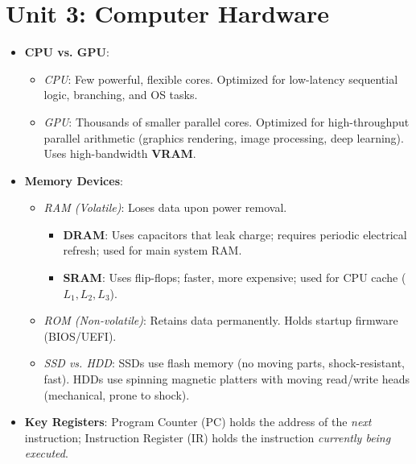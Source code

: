 \section*{Unit 3: Computer Hardware}
\begin{itemize}[leftmargin=6mm]
    \item \textbf{CPU vs. GPU}:
    \begin{itemize}
        \item \textit{CPU}: Few powerful, flexible cores. Optimized for low-latency sequential logic, branching, and OS tasks.
        \item \textit{GPU}: Thousands of smaller parallel cores. Optimized for high-throughput parallel arithmetic (graphics rendering, image processing, deep learning). Uses high-bandwidth \textbf{VRAM}.
    \end{itemize}
    \item \textbf{Memory Devices}:
    \begin{itemize}
        \item \textit{RAM (Volatile)}: Loses data upon power removal.
        \begin{itemize}
            \item \textbf{DRAM}: Uses capacitors that leak charge; requires periodic electrical refresh; used for main system RAM.
            \item \textbf{SRAM}: Uses flip-flops; faster, more expensive; used for CPU cache ($L_1, L_2, L_3$).
        \end{itemize}
        \item \textit{ROM (Non-volatile)}: Retains data permanently. Holds startup firmware (BIOS/UEFI).
        \item \textit{SSD vs. HDD}: SSDs use flash memory (no moving parts, shock-resistant, fast). HDDs use spinning magnetic platters with moving read/write heads (mechanical, prone to shock).
    \end{itemize}
    \item \textbf{Key Registers}: Program Counter (PC) holds the address of the \textit{next} instruction; Instruction Register (IR) holds the instruction \textit{currently being executed}.
\end{itemize}

